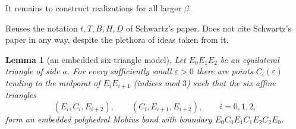 \documentclass[12pt]{article}
\newtheorem{lemma}{Lemma}
\newcommand{\review}[1]{\begin{reviewbox}#1\end{reviewbox}}
\begin{document}
It remains to construct realizations for all larger \(\beta\).

\review{Reuses the notation $t, T, B, H, D$ of Schwartz's paper. Does not cite Schwartz's paper in any way, despite the plethora of ideas taken from it.}

\begin{lemma}[an embedded six-triangle model]\label{lem:model}
Let \(E_0E_1E_2\) be an equilateral triangle of side \(a\).  For every
sufficiently small \(\varepsilon>0\) there are points \(C_i(\varepsilon)\)
tending to the midpoint of \(E_iE_{i+1}\) (indices mod \(3\)) such that
the six affine triangles
\[
(E_i,C_i,E_{i+2}),\qquad (C_i,E_{i+1},E_{i+2}),\qquad i=0,1,2,
\]
form an embedded polyhedral Mobius band with boundary
\(E_0C_0E_1C_1E_2C_2E_0\).
\end{lemma}
\end{document}
